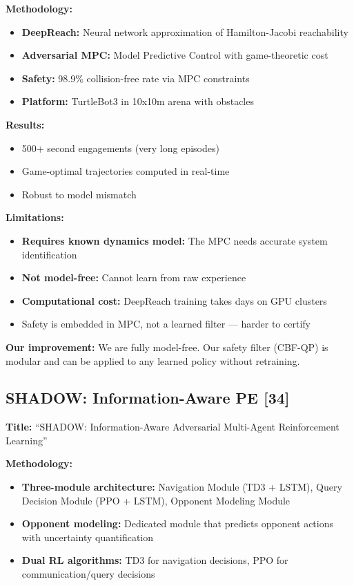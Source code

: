 \documentclass[11pt,a4paper]{report}
\begin{document}
\textbf{Methodology:}
\begin{itemize}
    \item \textbf{DeepReach:} Neural network approximation of Hamilton-Jacobi reachability
    \item \textbf{Adversarial MPC:} Model Predictive Control with game-theoretic cost
    \item \textbf{Safety:} 98.9\% collision-free rate via MPC constraints
    \item \textbf{Platform:} TurtleBot3 in 10x10m arena with obstacles
\end{itemize}

\textbf{Results:}
\begin{itemize}
    \item 500+ second engagements (very long episodes)
    \item Game-optimal trajectories computed in real-time
    \item Robust to model mismatch
\end{itemize}

\textbf{Limitations:}
\begin{itemize}
    \item \textbf{Requires known dynamics model:} The MPC needs accurate system identification
    \item \textbf{Not model-free:} Cannot learn from raw experience
    \item \textbf{Computational cost:} DeepReach training takes days on GPU clusters
    \item Safety is embedded in MPC, not a learned filter --- harder to certify
\end{itemize}

\textbf{Our improvement:} We are fully model-free. Our safety filter (CBF-QP) is modular and can be applied to any learned policy without retraining.

\subsection{SHADOW: Information-Aware PE [34]}

\textbf{Title:} ``SHADOW: Information-Aware Adversarial Multi-Agent Reinforcement Learning''

\textbf{Methodology:}
\begin{itemize}
    \item \textbf{Three-module architecture:} Navigation Module (TD3 + LSTM), Query Decision Module (PPO + LSTM), Opponent Modeling Module
    \item \textbf{Opponent modeling:} Dedicated module that predicts opponent actions with uncertainty quantification
    \item \textbf{Dual RL algorithms:} TD3 for navigation decisions, PPO for communication/query decisions
\end{itemize}
\end{document}
